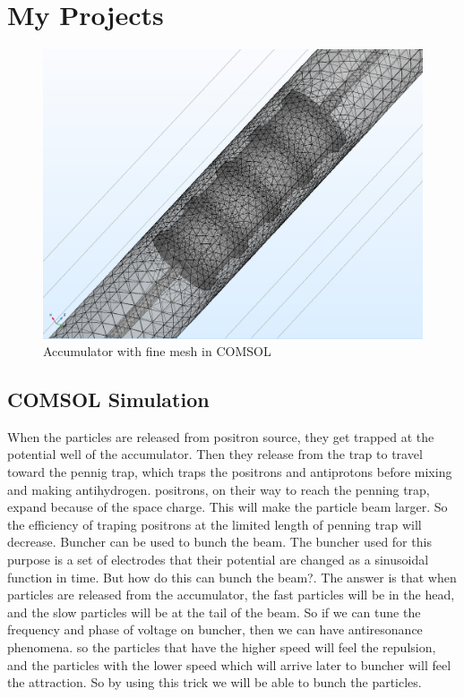 \documentclass[12pt,a4paper]{article}
\begin{document}
\section{My Projects}

\begin{figure}[h]
\centering
\includegraphics[scale=0.3]{Mesh}
\caption{Accumulator with fine mesh in COMSOL}
\end{figure}

\subsection{COMSOL Simulation}
When the particles are released from positron source, they get trapped at the potential well of the accumulator. Then they release from the trap to travel toward the pennig trap, which traps the positrons and antiprotons before mixing and making antihydrogen.  positrons, on their way to reach the penning trap, expand because of the space charge. This will make the particle beam larger. So the efficiency of traping positrons at the limited length of penning trap will decrease. Buncher can be used to bunch the beam. The buncher used for this purpose is a set of electrodes that their potential are changed as a sinusoidal function in time.
But how do this can bunch the beam?. The answer is that when particles are released from the accumulator, the fast particles will be in the head, and the slow particles will be at the tail of the beam. So if we can tune the frequency and phase of voltage on buncher, then we can have antiresonance phenomena. so the particles that have the higher speed will feel the repulsion, and the particles with the lower speed which will arrive later to buncher will feel the attraction.  So by using this trick we will be able to bunch the particles.
\end{document}
